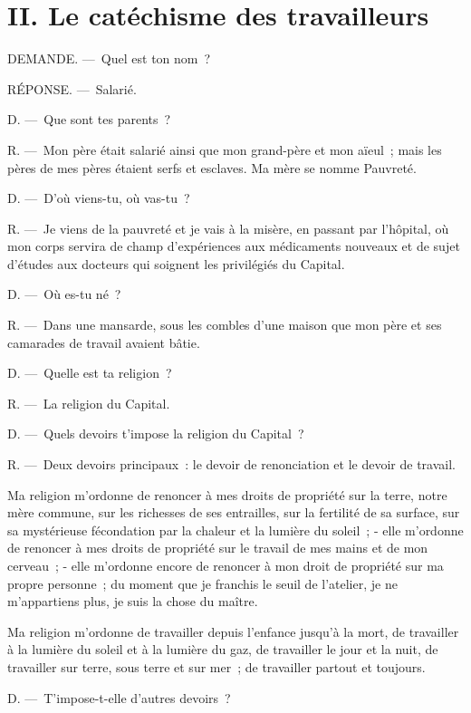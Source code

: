 \documentclass[french,twoside]{book} %
\begin{document}
\section[{II. Le catéchisme des travailleurs}]{II. Le catéchisme des travailleurs}\renewcommand{\leftmark}{II. Le catéchisme des travailleurs}

\noindent DEMANDE. — Quel est ton nom ?\par
RÉPONSE. — Salarié.\par
D. — Que sont tes parents ?\par
R. — Mon père était salarié ainsi que mon grand-père et mon aïeul ; mais les pères de mes pères étaient serfs et esclaves. Ma mère se nomme Pauvreté.\par
D. — D'où viens-tu, où vas-tu ?\par
R. — Je viens de la pauvreté et je vais à la misère, en passant par l’hôpital, où mon corps servira de champ d’expériences aux médicaments nouveaux et de sujet d’études aux docteurs qui soignent les privilégiés du Capital.\par
D. — Où es-tu né ?\par
R. — Dans une mansarde, sous les combles d’une maison que mon père et ses camarades de travail avaient bâtie.\par
D. — Quelle est ta religion ?\par
R. — La religion du Capital.\par
D. — Quels devoirs t’impose la religion du Capital ?\par
R. — Deux devoirs principaux : le devoir de renonciation et le devoir de travail.\par
Ma religion m’ordonne de renoncer à mes droits de propriété sur la terre, notre mère commune, sur les richesses de ses entrailles, sur la fertilité de sa surface, sur sa mystérieuse fécondation par la chaleur et la lumière du soleil ; - elle m’ordonne de renoncer à mes droits de propriété sur le travail de mes mains et de mon cerveau ; - elle m’ordonne encore de renoncer à mon droit de propriété sur ma propre personne ; du moment que je franchis le seuil de l’atelier, je ne m’appartiens plus, je suis la chose du maître.\par
Ma religion m’ordonne de travailler depuis l’enfance jusqu’à la mort, de travailler à la lumière du soleil et à la lumière du gaz, de travailler le jour et la nuit, de travailler sur terre, sous terre et sur mer ; de travailler partout et toujours.\par
D. — T'impose-t-elle d’autres devoirs ?\par
\end{document}
